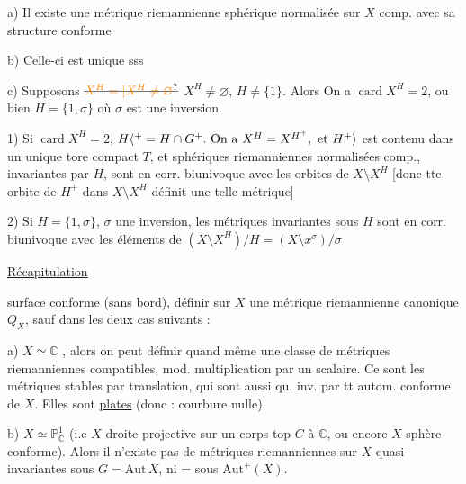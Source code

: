 a) Il existe une métrique riemannienne sphérique normalisée sur $X$ comp. avec sa structure conforme

b) Celle-ci est unique sss 

c) Supposons $\deleted{\unsure{X^H=|X^H\ne\varnothing}}$ $X^H\ne\varnothing$, $H\ne\{1\}$. Alors On a  $\operatorname{card}X^H=2$, ou bien $H=\{1,\sigma\}$ où $\sigma$ est une inversion.

1) Si $\operatorname{card}X^H=2$,  $H\inserted{{}^+=H\cap G^+.\ \text{On a }X^H=X^{H^+},\ \text{et }H^+}$ est contenu dans un unique tore compact $T$, et  sphériques riemanniennes normalisées comp., invariantes par  $H$, sont en corr. biunivoque avec les orbites de  \deleted{(}$X\setminus X^H$ [donc tte orbite de  $H^+$ dans $X\setminus X^H$ définit une telle métrique]


 2) Si $H=\{1,\sigma\}$, $\sigma$ une inversion, les métriques invariantes sous $H$ sont en corr. biunivoque avec les éléments de $(X\setminus X^H)/H=(X\setminus x^\sigma)/\sigma$

\uline{Récapitulation}

 surface conforme (sans bord),  définir sur $X$ une métrique riemannienne canonique $Q_X$,  sauf dans les deux cas suivants :

a) $X\simeq\mathbb C$ , alors on peut définir quand même une classe de métriques riemanniennes compatibles, mod. multiplication par un scalaire. Ce sont les métriques stables par translation, qui sont aussi qu. inv. par tt autom. conforme de $X$. Elles sont \uline{plates} (donc : courbure nulle).

b) $X\simeq\mathbb P^1_{\mathbb C}$ (i.e $X$ droite projective sur un corps top $C$  à $\mathbb C$, ou encore $X$ sphère conforme). Alors il n'existe pas de métriques riemanniennes sur $X$ quasi-invariantes sous $G=\mathrm{Aut}\,X$, ni = sous $\mathrm{Aut}^+(X)$.

